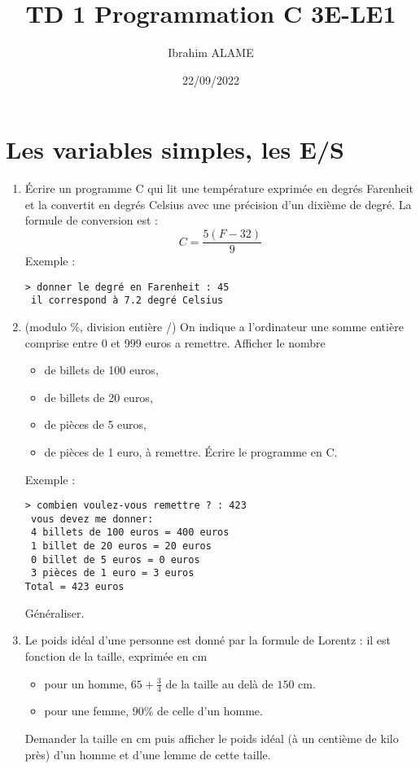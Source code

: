 \documentclass[a4paper]{article}
\title{TD 1  Programmation C 3E-LE1}
\author{Ibrahim ALAME}
\date{22/09/2022}
\begin{document}
\maketitle
\section{Les variables simples, les E/S}
\begin{enumerate}
\item Écrire un programme C qui lit une température exprimée en degrés Farenheit et la convertit en degrés Celsius avec une précision d'un dixième de degré. La formule de conversion est :
\[ C=\frac{5(F-32)}9\]
Exemple :
\begin{verbatim}
> donner le degré en Farenheit : 45
 il correspond à 7.2 degré Celsius
\end{verbatim}
\item (modulo \%, division entière /)
On indique a l'ordinateur une somme entière comprise entre 0 et 999 euros a remettre. Afficher le nombre
\begin{itemize}
\item de billets de 100 euros,
\item de billets de 20 euros,
\item de pièces de 5 euros,
\item de pièces de 1 euro,
à remettre. Écrire le programme en C.
\end{itemize}
Exemple :
\begin{verbatim}
> combien voulez-vous remettre ? : 423
 vous devez me donner:
 4 billets de 100 euros = 400 euros
 1 billet de 20 euros = 20 euros
 0 billet de 5 euros = 0 euros
 3 pièces de 1 euro = 3 euros
Total = 423 euros
\end{verbatim}
Généraliser.

\item Le poids idéal d'une personne est donné par la formule de Lorentz : il est fonction de la taille, exprimée en cm

\begin{itemize}
\item pour un homme, $65 + \frac 34$ de la taille au delà de $150$ cm.
\item pour une femme, $90\%$ de celle d'un homme.
\end{itemize}
Demander la taille en cm puis afficher le poids idéal (à un centième de kilo près) d'un homme et d'une lemme de cette taille.


\end{enumerate}
\end{document}

